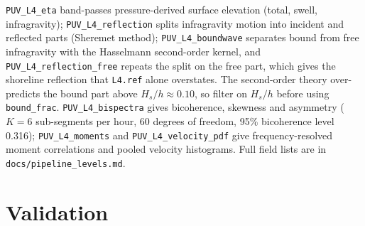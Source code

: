 \documentclass[11pt]{article}
\newcommand{\code}[1]{\texttt{#1}}
\begin{document}
\code{PUV\_L4\_eta} band-passes pressure-derived surface elevation (total, swell, infragravity);
\code{PUV\_L4\_reflection} splits infragravity motion into incident and reflected parts
(Sheremet method); \code{PUV\_L4\_boundwave} separates bound from free infragravity with the
Hasselmann second-order kernel, and \code{PUV\_L4\_reflection\_free} repeats the split on the free
part, which gives the shoreline reflection that \code{L4.ref} alone overstates. The second-order
theory over-predicts the bound part above $H_s/h \approx 0.10$, so filter on $H_s/h$ before
using \code{bound\_frac}. \code{PUV\_L4\_bispectra} gives bicoherence, skewness and asymmetry
($K = 6$ sub-segments per hour, 60 degrees of freedom, 95\% bicoherence level 0.316);
\code{PUV\_L4\_moments} and \code{PUV\_L4\_velocity\_pdf} give frequency-resolved moment
correlations and pooled velocity histograms. Full field lists are in
\code{docs/pipeline\_levels.md}.

\section{Validation}
\label{sec:validation}
\end{document}
